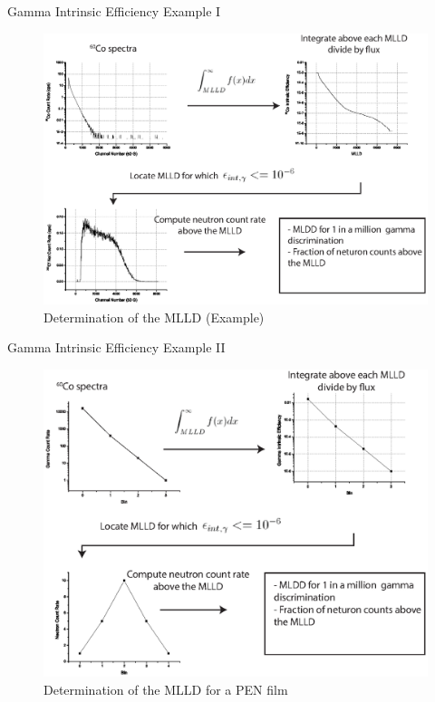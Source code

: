 \begin{frame}{Gamma Intrinsic Efficiency Example I}
	\begin{figure}
		\centering
		\includegraphics[height=0.5\textheight]{images/CartoonIntEffReal.eps}
		\caption{Determination of the MLLD (Example)}
		\label{fig:ElectronicsPSD}
	\end{figure}
\end{frame}
\begin{frame}{Gamma Intrinsic Efficiency Example II}
	\begin{figure}
		\centering
		\includegraphics[height=0.5\textheight]{images/CartoonIntEffSimple.eps}
		\caption{Determination of the MLLD for a PEN film}
		\label{fig:CartoonIntEffSimple}
	\end{figure}
\end{frame}
